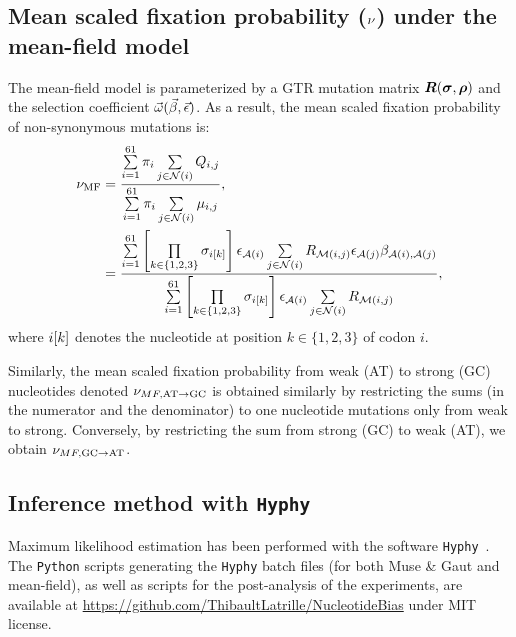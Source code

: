 \subsection{Mean scaled fixation probability (\texorpdfstring{$\nu$}{ν}) under the mean-field model}
\label{sec:mut-bias-mean-field-omega}
The mean-field model is parameterized by a GTR mutation matrix $\bm{R}(\bm{\sigma}, \bm{\rho})$ and the selection coefficient $\vec{\omega}(\vec{\beta}, \vec{\epsilon})$.
As a result, the mean scaled fixation probability of non-synonymous mutations is:
\begin{align}
    \nu_{\text{MF}} & = \dfrac{ \sum\limits_{{i}=1}^{61} \pi_{{i}} \sum\limits_{{j} \in \mathcal{N}\left({i}\right)} Q_{{i}, {j}}}{ \sum\limits_{{i}=1}^{61} \pi_{{i}} \sum\limits_{{j} \in \mathcal{N}\left({i}\right)} \mu_{{i}, {j}}}, \\
    & = \dfrac{ \sum\limits_{{i}=1}^{61} \left[\prod\limits_{k \in \{ 1, 2, 3 \}} \sigma_{{i}[k]}\right] \epsilon_{\mathcal{A}({i})} \sum\limits_{{j} \in \mathcal{N}\left({i}\right)} R_{\mathcal{M}({i}, {j})} \epsilon_{\mathcal{A}({j})} \beta_{\mathcal{A}({i}), \mathcal{A}({j})} }{\sum\limits_{{i}=1}^{61} \left[\prod\limits_{k \in \{ 1, 2, 3 \}} \sigma_{{i}[k]}\right] \epsilon_{\mathcal{A}({i})} \sum\limits_{{j} \in \mathcal{N}\left({i}\right)} R_{\mathcal{M}({i}, {j})}},
\end{align}
where ${i}[k]$ denotes the nucleotide at position $k \in \{ 1, 2, 3 \}$ of codon $i$.

Similarly, the mean scaled fixation probability from weak (AT) to strong (GC) nucleotides denoted $\nu_{MF, \text{AT} \rightarrow \text{GC}}$ is obtained similarly by restricting the sums (in the numerator and the denominator) to one nucleotide mutations only from weak to strong.
Conversely, by restricting the sum from strong (GC) to weak (AT), we obtain $\nu_{MF, \text{GC} \rightarrow \text{AT}}$.

\subsection{Inference method with \texttt{Hyphy}}
\label{subsec:inference-method-with-hyphy}

Maximum likelihood estimation has been performed with the software \texttt{Hyphy}~\citep{Pond2005}.
The \texttt{Python} scripts generating the \texttt{Hyphy} batch files (for both Muse \& Gaut and mean-field), as well as scripts for the post-analysis of the experiments, are available at \url{https://github.com/ThibaultLatrille/NucleotideBias} under MIT license.

